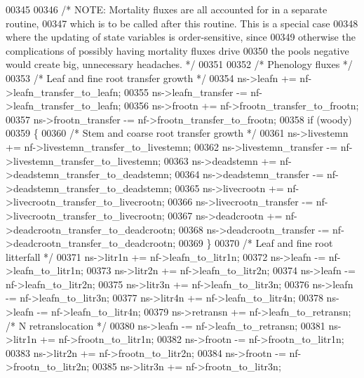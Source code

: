 \begin{DoxyCode}
{00345     
00346     \textcolor{comment}{/* NOTE: Mortality fluxes are all accounted for in a separate routine, }
00347 \textcolor{comment}{    which is to be called after this routine.  This is a special case}
00348 \textcolor{comment}{    where the updating of state variables is order-sensitive, since }
00349 \textcolor{comment}{    otherwise the complications of possibly having mortality fluxes drive }
00350 \textcolor{comment}{    the pools negative would create big, unnecessary headaches. */}
00351     
00352     \textcolor{comment}{/* Phenology fluxes */}
00353     \textcolor{comment}{/* Leaf and fine root transfer growth */}
00354     ns->leafn           += nf->leafn\_transfer\_to\_leafn;
00355     ns->leafn\_transfer  -= nf->leafn\_transfer\_to\_leafn;
00356     ns->frootn          += nf->frootn\_transfer\_to\_frootn;
00357     ns->frootn\_transfer -= nf->frootn\_transfer\_to\_frootn;
00358     \textcolor{keywordflow}{if} (woody)
00359     \{
00360         \textcolor{comment}{/* Stem and coarse root transfer growth */}
00361         ns->livestemn           += nf->livestemn\_transfer\_to\_livestemn;
00362         ns->livestemn\_transfer  -= nf->livestemn\_transfer\_to\_livestemn;
00363         ns->deadstemn           += nf->deadstemn\_transfer\_to\_deadstemn;
00364         ns->deadstemn\_transfer  -= nf->deadstemn\_transfer\_to\_deadstemn;
00365         ns->livecrootn          += nf->livecrootn\_transfer\_to\_livecrootn;
00366         ns->livecrootn\_transfer -= nf->livecrootn\_transfer\_to\_livecrootn;
00367         ns->deadcrootn          += nf->deadcrootn\_transfer\_to\_deadcrootn;
00368         ns->deadcrootn\_transfer -= nf->deadcrootn\_transfer\_to\_deadcrootn;
00369     \}
00370     \textcolor{comment}{/* Leaf and fine root litterfall */}
00371     ns->litr1n     += nf->leafn\_to\_litr1n;
00372     ns->leafn      -= nf->leafn\_to\_litr1n;
00373     ns->litr2n     += nf->leafn\_to\_litr2n;
00374     ns->leafn      -= nf->leafn\_to\_litr2n;
00375     ns->litr3n     += nf->leafn\_to\_litr3n;
00376     ns->leafn      -= nf->leafn\_to\_litr3n;
00377     ns->litr4n     += nf->leafn\_to\_litr4n;
00378     ns->leafn      -= nf->leafn\_to\_litr4n;
00379     ns->retransn   += nf->leafn\_to\_retransn;   \textcolor{comment}{/* N retranslocation */}
00380     ns->leafn      -= nf->leafn\_to\_retransn;
00381     ns->litr1n     += nf->frootn\_to\_litr1n;
00382     ns->frootn     -= nf->frootn\_to\_litr1n;
00383     ns->litr2n     += nf->frootn\_to\_litr2n;
00384     ns->frootn     -= nf->frootn\_to\_litr2n;
00385     ns->litr3n     += nf->frootn\_to\_litr3n;
}
\end{DoxyCode}
